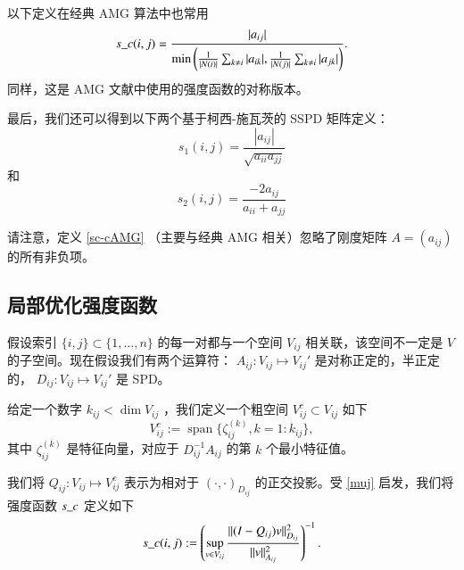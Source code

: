 \documentclass[12pt]{acta_2011xz}
\begin{document}
以下定义在经典 AMG 算法中也常用
   \begin{equation}\label{def:strong-connection-2}
s\_c(i,j)=\frac{|a_{ij}|}{\min\bigg(\frac{1}{|N(i)|}\sum_{k\neq i}|a_{ik}|, \frac{1}{|N(j)|}\sum_{k\neq i}
|a_{jk}|\bigg)}.
\end{equation}    同样，这是 AMG 文献中使用的强度函数的对称版本。  

最后，我们还可以得到以下两个基于柯西-施瓦茨的 SSPD 矩阵定义：
   \begin{equation}\label{strong-connection-1}
s_1(i,j)=\frac{|a_{ij}|}{\sqrt{a_{ii}a_{jj}}} 
\end{equation}    和 
   \begin{equation}\label{strong-connection-2}
s_2(i,j)=\frac{-2a_{ij}}{a_{ii}+a_{jj}} 
\end{equation}     

请注意，定义    \eqref{sc-cAMG}    （主要与经典 AMG 相关）忽略了刚度矩阵    $A=(a_{ij})$    的所有非负项。  


   


   

   \subsection{局部优化强度函数  }    假设索引    $ \{ i, j \} \subset  \{ 1, \dots, n \} $    的每一对都与一个空间    $V_{ij}$    相关联，该空间不一定是    $V$    的子空间。现在假设我们有两个运算符：   $A_{ij}: V_{ij}\mapsto V_{ij}'$    是对称正定的，半正定的，   $D_{ij}: V_{ij}\mapsto V_{ij}'$    是 SPD。  

给定一个数字    $k_{ij}< \dim V_{ij}$    ，我们定义一个粗空间    $V_{ij}^c\subset V_{ij}$    如下
   \begin{equation*}
    V_{ij}^c:=\operatorname{span} \{ \zeta_{ij}^{(k)}, k=1: k_{ij} \} ,
\end{equation*}    其中    $\zeta_{ij}^{(k)}$    是特征向量，对应于    $D_{ij}^{-1}A_{ij}$    的第    $k$    个最小特征值。  

我们将    $Q_{ij}: V_{ij}\mapsto V_{ij}^c$    表示为相对于    $(\cdot, \cdot)_{D_{ij}}$    的正交投影。受    \eqref{muj}    启发，我们将强度函数    $s\_c$    定义如下
   \begin{equation}\label{local-opt-sc}
    s\_c(i, j):=\left(\sup_{v\in V_{ij}}\frac{\|(I-Q_{ij})v\|_{D_{ij}}^2}{\|v\|_{A_{ij}}^2}\right)^{-1}.
\end{equation}     
\end{document}
